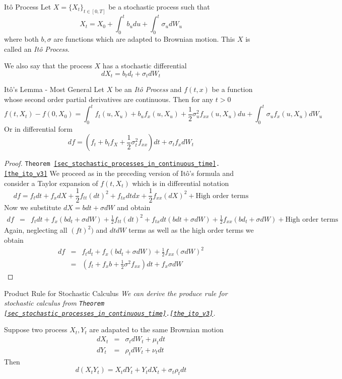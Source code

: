 \documentclass[11pt,a4paper]{article}
\begin{document}
  \begin{definition}{It\^o Process}
    Let $X=\{X_t\}_{t\in[0,T]}$ be a stochastic process such that
    \[ X_t=X_0+\int_0^tb_udu+\int_0^t\sigma_udW_u \]
    where both $b,\sigma$ are functions which are adapted to Brownian motion. This $X$ is called an \textit{It\^o Process}.
    \par We also say that the process $X$ has a stochastic differential
    \[ dX_t=b_td_t+\sigma_tdW_t \]
  \end{definition}

  \begin{theorem}{It\^o's Lemma - Most General}\label{the_ito_v3}
    Let $X$ be an \textit{It\^o Process} and $f(t,x)$ be a function  whose second order partial derivatives are continuous. Then for any $t>0$
    \[ f(t,X_t)-f(0,X_0)=\int_0^tf_t(u,X_u)+b_uf_x(u,X_u)+\frac12\sigma^2_uf_{xx}(u,X_u)du+\int_0^t\sigma_uf_x(u,X_u)dW_u \]
    Or in differential form
    \[ df=\left(f_t+b_tf_X+\frac12\sigma_t^2f_{xx}\right)dt+\sigma_tf_xdW_t \]
  \end{theorem}

  \begin{proof}{\texttt{Theorem \ref{sec_stochastic_processes_in_continuous_time}.\ref{the_ito_v3}}}
    We proceed as in the preceding version of It\^o's formula and consider a Taylor expansion of $f(t,X_t)$ which is in differential notation
    \[ df=f_tdt+f_xdX+\frac12f_{tt}(dt)^2+f_{tx}dtdx+\frac12f_{xx}(dX)^2+\text{High order terms} \]
    Now we substitute $dX=bdt+\sigma dW$ and obtain
    \[\begin{array}{rcl}
      df&=&f_tdt+f_x(bd_t+\sigma dW)+\frac12f_{tt}(dt)^2+f_{tx}dt(bdt+\sigma dW)+\frac12f_{xx}(bd_t+\sigma dW)+\text{High order terms}
    \end{array}\]
    Again, neglecting all $(ft)^2)$ and $dtdW$ terms as well as the high order terms we obtain
    \[\begin{array}{rcl}
      df&=&f_td_t+f_x(bd_t+\sigma dW)+\frac12f_{xx}(\sigma dW)^2\\
      &=&(f_t+f_xb+\frac12\sigma^2f_{xx})dt+f_x\sigma dW
    \end{array}\]
  \end{proof}

  \begin{theorem}{Product Rule for Stochastic Calculus}\label{the_product_rule_stochastic_calculus}
    \textit{We can derive the produce rule for stochastic calculus from \texttt{Theorem \ref{sec_stochastic_processes_in_continuous_time}.\ref{the_ito_v3}}.}
    \par Suppose two process $X_t,Y_t$ are adapated to the same Brownian motion
    \[\begin{array}{rcl}
      dX_t&=&\sigma_tdW_t+\mu_tdt\\
      dY_t&=&\rho_tdW_t+\nu_tdt
    \end{array}\]
    Then
    \[ d(X_tY_t)=X_tdY_t+Y_tdX_t+\sigma_t\rho_tdt \]
  \end{theorem}
\end{document}
